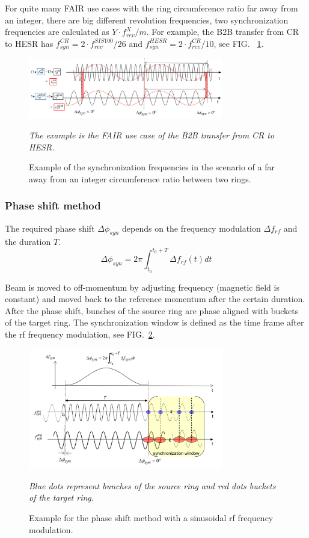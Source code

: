 For quite many FAIR use cases with the ring circumference ratio far away from an integer, there are big different revolution frequencies, two synchronization frequencies are calculated as $Y\cdot f_\mathit{rev}^{X}/m$. For example, the B2B transfer from CR to HESR has $f_{\mathit{syn}}^{CR}=2\cdot f_{\mathit{rev}}^{SIS100}/26$ and $f_{\mathit{syn}}^{HESR}=2\cdot f_{\mathit{rev}}^{CR}/10$, see FIG. ~\ref{CR-HESR}.  
\begin{figure}[!htb]
   \centering   
   \includegraphics*[width=85mm]{CR-HESR.png}
   \caption{Example of the synchronization frequencies in the scenario of a far away from an integer circumference ratio between two rings.}
{\textsl{\small{The example is the FAIR use case of the B2B transfer from CR to HESR.}}}
   \label{CR-HESR}
\end{figure} 


\subsubsection{Phase shift method}
The required phase shift $\Delta \phi_\mathit{syn}$ depends on the frequency modulation $\Delta f_\mathit{rf}$ and the duration $T$. 
\begin{equation}
\Delta \phi_\mathit{syn}= 2\pi \int_{t_0}^{t_0+T} \Delta f_\mathit{rf}(t)dt \label{phase1}
\end{equation}

Beam is moved to off-momentum by adjusting frequency (magnetic field is constant) and moved back to the reference momentum after the certain duration. After the phase shift, bunches of the source ring are phase aligned with buckets of the target ring. The synchronization window is defined as the time frame after the rf frequency modulation, see FIG.~\ref{phase_shift}.
\begin{figure}[!htb]
   \centering   
   \includegraphics*[width=85mm]{phase_shift.png}
   \caption{Example for the phase shift method with a sinusoidal rf frequency modulation.}{\textsl{\small{Blue dots represent bunches of the source ring and red dots buckets of the target ring.}}}
   \label{phase_shift}
\end{figure} 

